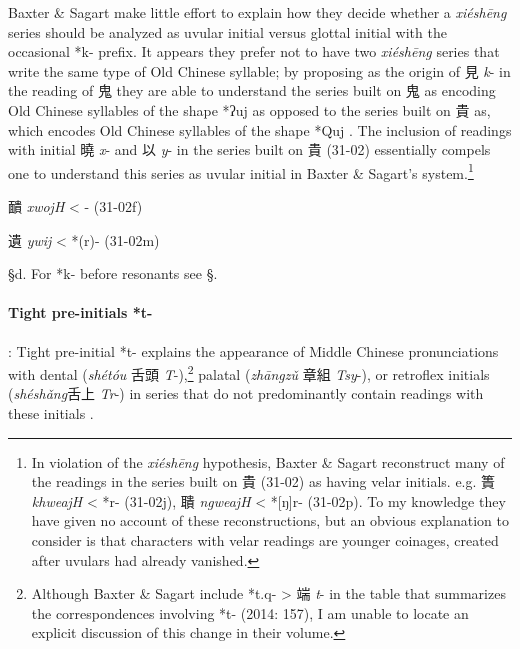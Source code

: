 Baxter \& Sagart make little effort to explain how they decide whether a
 \emph{xiéshēng} series should be analyzed as uvular initial versus
glottal initial with the occasional *k- prefix. It appears they prefer
not to have two  \emph{xiéshēng} series that write the same type of Old
Chinese syllable; by proposing {} as the origin of 見  
\emph{k}- in the
reading of 鬼 \emph{{}} they are able to understand the series built
on 鬼 as encoding Old Chinese syllables of the shape *ʔuj as opposed to
the series built on 貴 as, which encodes Old Chinese syllables of the
shape *Quj \citep[151 n. 79 on p. 391]{Baxter2014OldChinese}. The inclusion
of readings with initial 曉 \emph{x}- and 以  \emph{y}- in the series
built on 貴 (31-02) essentially compels one to understand this series as
uvular initial in Baxter \& Sagart's system.\footnote{In violation of
  the \emph{xiéshēng} hypothesis, Baxter \& Sagart reconstruct many of
  the readings in the series built on 貴 (31-02) as having velar
  initials. e.g. 簣 \emph{khweajH} \textless{} *{}{}r- (31-02j), 聵
  \emph{ngweajH} \textless{} *[ŋ]{}r- (31-02p). To my knowledge they
  have given no account of these reconstructions, but an obvious
  explanation to consider is that characters with velar readings are
  younger coinages, created after uvulars had already vanished.}

\begin{description} \item
靧  \emph{xwojH} \textless{} {}{}- (31-02f)
\item
遺  \emph{ywij} \textless{} *{}(r)- (31-02m)
\end{description}

§d. For *k- before resonants see §.

\paragraph{Tight pre-initials \textbf{*t-}}:
Tight pre-initial *t- explains the appearance of Middle Chinese
pronunciations with dental (\emph{shétóu} 舌頭  \emph{T}-),\footnote{Although
  Baxter \& Sagart include *t.q{}- \textgreater{} 端  \emph{t}- in the
  table that summarizes the correspondences involving *t- (2014: 157), I
  am unable to locate an explicit discussion of this change in their
  volume.} palatal (\emph{zhāngzǔ} 章組  \emph{Tsy}-), or retroflex
initials (\emph{shéshǎng}舌上 \emph{Tr}-) in series that do not
predominantly contain readings with these initials 
\citep[157-159]{Baxter2014OldChinese}.

